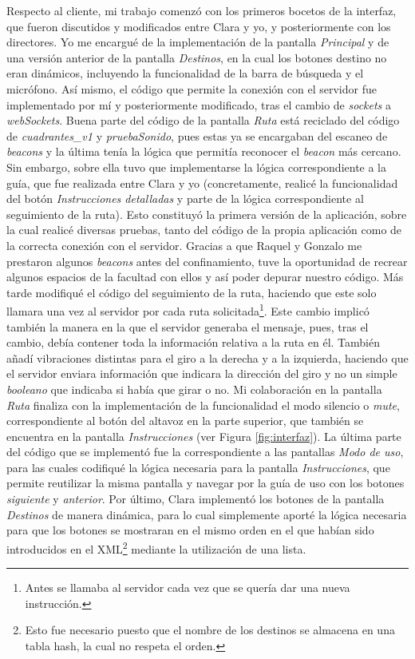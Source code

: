 Respecto al cliente, mi trabajo comenzó con los primeros bocetos de la interfaz, que fueron discutidos y modificados entre Clara y yo, y posteriormente con los directores. Yo me encargué de la implementación de la pantalla \textit{Principal} y de una versión anterior de la pantalla \textit{Destinos}, en la cual los botones destino no eran dinámicos, incluyendo la funcionalidad de la barra de búsqueda y el micrófono. Así mismo, el código que permite la conexión con el servidor fue implementado por mí y posteriormente modificado, tras el cambio de \textit{sockets} a \textit{webSockets}. Buena parte del código de la pantalla \textit{Ruta} está reciclado del código de \textit{cuadrantes\_v1} y \textit{pruebaSonido}, pues estas ya se encargaban del escaneo de \textit{beacons} y la última tenía la lógica que permitía reconocer el \textit{beacon} más cercano. Sin embargo, sobre ella tuvo que implementarse la lógica correspondiente a la guía, que fue realizada entre Clara y yo (concretamente, realicé la funcionalidad del botón \textit{Instrucciones detalladas} y parte de la lógica correspondiente al seguimiento de la ruta). Esto constituyó la primera versión de la aplicación, sobre la cual realicé diversas pruebas, tanto del código de la propia aplicación como de la correcta conexión con el servidor. Gracias a que Raquel y Gonzalo me prestaron algunos \textit{beacons} antes del confinamiento, tuve la oportunidad de recrear algunos espacios de la facultad con ellos y así poder depurar nuestro código. Más tarde modifiqué el código del seguimiento de la ruta, haciendo que este solo llamara una vez al servidor por cada ruta solicitada\footnote{Antes se llamaba al servidor cada vez que se quería dar una nueva instrucción.}. Este cambio implicó también la manera en la que el servidor generaba el mensaje, pues, tras el cambio, debía contener toda la información relativa a la ruta en él. También añadí vibraciones distintas para el giro a la derecha y a la izquierda, haciendo que el servidor enviara información que indicara la dirección del giro y no un simple \textit{booleano} que indicaba si había que girar o no. Mi colaboración en la pantalla \textit{Ruta} finaliza con la implementación de la funcionalidad el modo silencio o \textit{mute}, correspondiente al botón del altavoz en la parte superior, que también se encuentra en la pantalla \textit{Instrucciones} (ver Figura \ref{fig:interfaz}). La última parte del código que se implementó fue la correspondiente a las pantallas \textit{Modo de uso}, para las cuales codifiqué la lógica necesaria para la pantalla \textit{Instrucciones}, que permite reutilizar la misma pantalla y navegar por la guía de uso con los botones \textit{siguiente} y \textit{anterior}. Por último, Clara implementó los botones de la pantalla \textit{Destinos} de manera dinámica, para lo cual simplemente aporté la lógica necesaria para que los botones se mostraran en el mismo orden en el que habían sido introducidos en el XML\footnote{Esto fue necesario puesto que el nombre de los destinos se almacena en una tabla hash, la cual no respeta el orden.} mediante la utilización de una lista.


